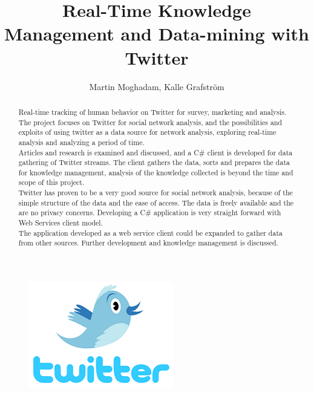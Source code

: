 \documentclass[]{article}  %
\begin{document}
\title{Real-Time Knowledge Management and Data-mining with Twitter}   %
\author{Martin Moghadam, Kalle Grafstr\"{o}m}         %
\maketitle

\begin{figure}[h]
\centering
\includegraphics[scale=1]{Twitter_Icon.png}
\end{figure}

\begin{abstract}
  Real-time tracking of human behavior on Twitter for survey, marketing and analysis. \\  The project focuses on Twitter for social network analysis, and the possibilities and exploits of using twitter as a data source for network analysis, exploring real-time analysis and analyzing a period of time. \\ Articles and research is examined and discussed, and a C\# client is developed for data gathering of Twitter streams. The client gathers the data, sorts and prepares the data for knowledge management, analysis of the knowledge collected is beyond the time and scope of this project. \\ Twitter has proven to be a very good source for social network analysis, because of the simple structure of the data and the ease of access. The data is freely available and the are no privacy concerns. Developing a C\# application is very straight forward with Web Services client model. \\ The application developed as a web service client could be expanded to gather data from other sources. Further development and knowledge management is discussed.

\end{abstract}





\end{document}
